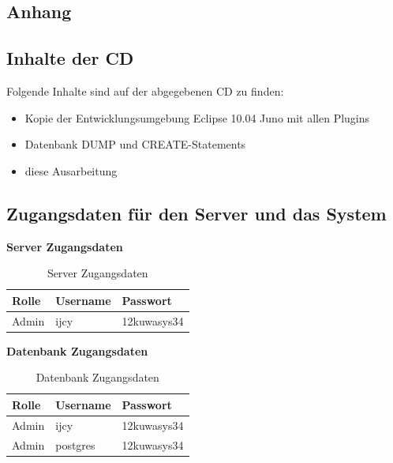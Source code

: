 \documentclass[12pt, twoside, a4paper, ngerman]{article}
\begin{document}
\begin{appendix}
\section{Anhang}\label{sec:Anhang}

\subsection{Inhalte der CD}
Folgende Inhalte sind auf der abgegebenen CD zu finden:

\begin{itemize}
  \item Kopie der Entwicklungsumgebung Eclipse 10.04 Juno mit allen Plugins
  \item Datenbank DUMP und CREATE-Statements
  \item diese Ausarbeitung
\end{itemize}

\subsection{Zugangsdaten für den Server und das System}

\textbf{Server Zugangsdaten}

\begin{table}[H]
\begin{center}
	\begin{tabular}{|l|l|l||}\hline
		\textbf{Rolle} & \textbf{Username} & \textbf{Passwort} \\ \hline
		Admin & ijcy & 12kuwasys34 \\ \hline \hline
	\end{tabular}
	\caption{Server Zugangsdaten}
\end{center}
\end{table}

\textbf{Datenbank Zugangsdaten}

\begin{table}[H]
\begin{center}
	\begin{tabular}{|l|l|l||}\hline
		\textbf{Rolle} & \textbf{Username} & \textbf{Passwort} \\ \hline
		Admin & ijcy & 12kuwasys34 \\ \hline
		Admin & postgres & 12kuwasys34 \\ \hline \hline
	\end{tabular}
	\caption{Datenbank Zugangsdaten}
\end{center}
\end{table}


\end{appendix}
\end{document}
